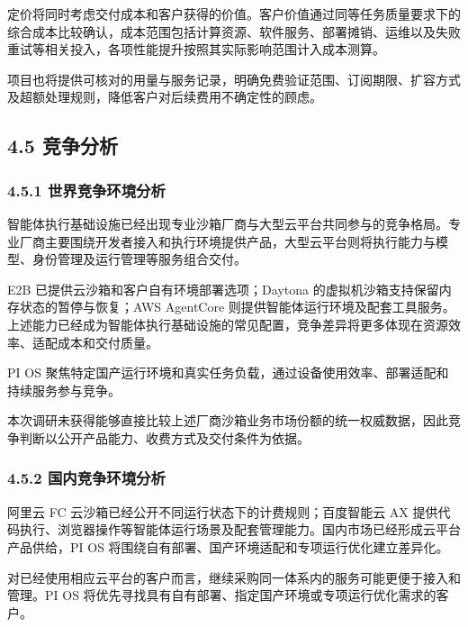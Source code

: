 定价将同时考虑交付成本和客户获得的价值。客户价值通过同等任务质量要求下的综合成本比较确认，成本范围包括计算资源、软件服务、部署摊销、运维以及失败重试等相关投入，各项性能提升按照其实际影响范围计入成本测算。

项目也将提供可核对的用量与服务记录，明确免费验证范围、订阅期限、扩容方式及超额处理规则，降低客户对后续费用不确定性的顾虑。

\subsection{4.5 竞争分析}\label{ux7adeux4e89ux5206ux6790}

\subsubsection{4.5.1 世界竞争环境分析}\label{ux4e16ux754cux7adeux4e89ux73afux5883ux5206ux6790}

智能体执行基础设施已经出现专业沙箱厂商与大型云平台共同参与的竞争格局。专业厂商主要围绕开发者接入和执行环境提供产品，大型云平台则将执行能力与模型、身份管理及运行管理等服务组合交付。

E2B 已提供云沙箱和客户自有环境部署选项；Daytona 的虚拟机沙箱支持保留内存状态的暂停与恢复；AWS AgentCore 则提供智能体运行环境及配套工具服务。上述能力已经成为智能体执行基础设施的常见配置，竞争差异将更多体现在资源效率、适配成本和交付质量。

PI OS 聚焦特定国产运行环境和真实任务负载，通过设备使用效率、部署适配和持续服务参与竞争。

本次调研未获得能够直接比较上述厂商沙箱业务市场份额的统一权威数据，因此竞争判断以公开产品能力、收费方式及交付条件为依据。

\subsubsection{4.5.2 国内竞争环境分析}\label{ux56fdux5185ux7adeux4e89ux73afux5883ux5206ux6790}


阿里云 FC 云沙箱已经公开不同运行状态下的计费规则；百度智能云 AX 提供代码执行、浏览器操作等智能体运行场景及配套管理能力。国内市场已经形成云平台产品供给，PI OS 将围绕自有部署、国产环境适配和专项运行优化建立差异化。

对已经使用相应云平台的客户而言，继续采购同一体系内的服务可能更便于接入和管理。PI OS 将优先寻找具有自有部署、指定国产环境或专项运行优化需求的客户。


